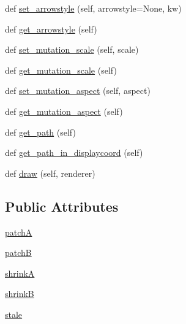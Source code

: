 \begin{DoxyCompactItemize}
def \hyperlink{classmatplotlib_1_1patches_1_1FancyArrowPatch_a123de11919e7b89dc5ae897996b973df}{set\+\_\+arrowstyle} (self, arrowstyle=None, kw)
\item 
def \hyperlink{classmatplotlib_1_1patches_1_1FancyArrowPatch_ab4e9789f527773c0cdab2673ffb03450}{get\+\_\+arrowstyle} (self)
\item 
def \hyperlink{classmatplotlib_1_1patches_1_1FancyArrowPatch_a9078402bc1d11a6e8b6eaa3376aec8fd}{set\+\_\+mutation\+\_\+scale} (self, scale)
\item 
def \hyperlink{classmatplotlib_1_1patches_1_1FancyArrowPatch_a478981f35ee70830e657bbd2f2cd11eb}{get\+\_\+mutation\+\_\+scale} (self)
\item 
def \hyperlink{classmatplotlib_1_1patches_1_1FancyArrowPatch_a213595673a4aa3a4d69e374469421879}{set\+\_\+mutation\+\_\+aspect} (self, aspect)
\item 
def \hyperlink{classmatplotlib_1_1patches_1_1FancyArrowPatch_a535c7a4d04e12f4942d9f23204103235}{get\+\_\+mutation\+\_\+aspect} (self)
\item 
def \hyperlink{classmatplotlib_1_1patches_1_1FancyArrowPatch_a8ef63d2b520f03cb2258fdd648894b3e}{get\+\_\+path} (self)
\item 
def \hyperlink{classmatplotlib_1_1patches_1_1FancyArrowPatch_a1ea78a6291933a886819409e8d4c1158}{get\+\_\+path\+\_\+in\+\_\+displaycoord} (self)
\item 
def \hyperlink{classmatplotlib_1_1patches_1_1FancyArrowPatch_ae0232201aca337507b91026b82a2ceaa}{draw} (self, renderer)
\end{DoxyCompactItemize}
\subsection*{Public Attributes}
\begin{DoxyCompactItemize}
\item 
\hyperlink{classmatplotlib_1_1patches_1_1FancyArrowPatch_a0444e1655457096a5aa201177e789f88}{patchA}
\item 
\hyperlink{classmatplotlib_1_1patches_1_1FancyArrowPatch_a9cc415418cb63ac92789d825f6807e1e}{patchB}
\item 
\hyperlink{classmatplotlib_1_1patches_1_1FancyArrowPatch_adfb328e84a682e61d16ab31c90bb0290}{shrinkA}
\item 
\hyperlink{classmatplotlib_1_1patches_1_1FancyArrowPatch_a54e1943557952ab7abc9be952291556e}{shrinkB}
\item 
\hyperlink{classmatplotlib_1_1patches_1_1FancyArrowPatch_a93fa6b9f8ce3fb61020edce8e8b54802}{stale}
\end{DoxyCompactItemize}

